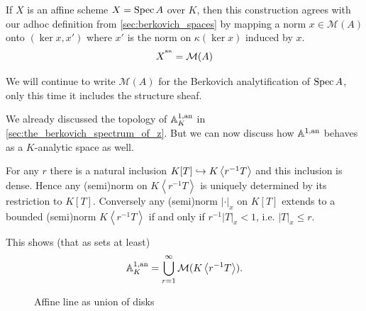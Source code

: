 \begin{remark}
	If $X$ is an affine scheme $X = \operatorname{Spec} A$ over $K$, then this construction agrees with our adhoc definition from \cref{sec:berkovich_spaces}
	by mapping a norm $x \in \mathcal{M} (A)$ onto $(\ker x, x')$ where $x'$ is the norm on $\kappa(\ker x)$ induced by $x$. 
	\[
		X^{{}^{\text{an}}} = \mathcal{M} (A)
	\] 

	We will continue to write $\mathcal{M} (A)$ for the Berkovich analytification of $\operatorname{Spec} A$, only this time it includes the structure sheaf. 
\end{remark}



\begin{example}\label{ex:affine_line_union_disks}
	We already discussed the topology of $\mathbb{A}^{1, \text{an}}_K$ in \cref{sec:the_berkovich_spectrum_of_z}. 
	But we can now discuss how $\mathbb{A}^{1, \text{an}}$ behaves as a $K$-analytic space as well. 

	For any $r$ there is a natural inclusion $K[T] \hookrightarrow K\left<r^{-1} T \right>$ and this inclusion is dense. 
	Hence any (semi)norm on $K\left<r^{-1}T \right>$ is uniquely determined by its restriction to $K[T]$.
	Conversely any (semi)norm $|\cdot |_x$ on  $K[T]$ extends to a bounded (semi)norm $K\left<r^{-1}T \right>$ if and only if $r^{-1}|T|_x < 1$, i.e. $|T|_x \le r$. 

	This shows (that as sets at least)
	\[
		\mathbb{A}^{1, \text{an}}_K = \bigcup_{r = 1} ^{\infty} \mathcal{M} (K\left<r^{-1} T \right>)
	.\] 

\begin{figure}[ht]
    \centering
    \caption{Affine line as union of disks}
    \label{fig:affine-line-as-union-of-disks}
\end{figure}
\end{example}

